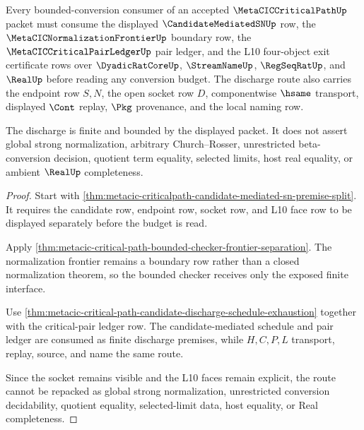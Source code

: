 
\begin{theorem}
\label{thm:metacic-critical-path-bounded-conversion-discharge}
Every bounded-conversion consumer of an accepted $\MetaCICCriticalPathUp$ packet must consume the displayed $\CandidateMediatedSNUp$ row, the $\MetaCICNormalizationFrontierUp$ boundary row, the $\MetaCICCriticalPairLedgerUp$ pair ledger, and the L10 four-object exit certificate rows over $\DyadicRatCoreUp$, $\StreamNameUp$, $\RegSeqRatUp$, and $\RealUp$ before reading any conversion budget. The discharge route also carries the endpoint row $S,N$, the open socket row $D$, componentwise $\hsame$ transport, displayed $\Cont$ replay, $\Pkg$ provenance, and the local naming row.

The discharge is finite and bounded by the displayed packet. It does not assert global strong normalization, arbitrary Church--Rosser, unrestricted beta-conversion decision, quotient term equality, selected limits, host real equality, or ambient $\RealUp$ completeness.
\end{theorem}
\begin{proof}
Start with \autoref{thm:metacic-criticalpath-candidate-mediated-sn-premise-split}. It requires the candidate row, endpoint row, socket row, and L10 face row to be displayed separately before the budget is read.

Apply \autoref{thm:metacic-critical-path-bounded-checker-frontier-separation}. The normalization frontier remains a boundary row rather than a closed normalization theorem, so the bounded checker receives only the exposed finite interface.

Use \autoref{thm:metacic-critical-path-candidate-discharge-schedule-exhaustion} together with the critical-pair ledger row. The candidate-mediated schedule and pair ledger are consumed as finite discharge premises, while $H,C,P,L$ transport, replay, source, and name the same route.

Since the socket remains visible and the L10 faces remain explicit, the route cannot be repacked as global strong normalization, unrestricted conversion decidability, quotient equality, selected-limit data, host equality, or Real completeness.
\end{proof}

